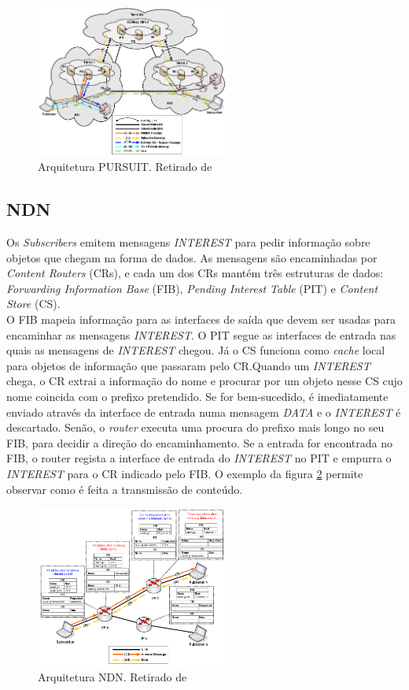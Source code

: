 \documentclass[conference]{IEEEtran}
\begin{document}
\begin{figure}[!t]
\centering
\includegraphics[width=2.5in]{pursuit}
\caption{Arquitetura PURSUIT. Retirado de \cite{surveyICN}}
\label{pursuit}
\end{figure}


\subsection{NDN}

Os \textit{Subscribers} emitem mensagens \textit{INTEREST} para pedir informa\c{c}\~{a}o sobre objetos que chegam na forma de dados. As mensagens s\~{a}o encaminhadas por \textit{Content Routers} (CRs), e cada um dos CRs mant\'{e}m tr\^{e}s estruturas de dados: \textit{Forwarding Information Base} (FIB), \textit{Pending Interest Table} (PIT) e \textit{Content Store} (CS). \\

O FIB mapeia informa\c{c}\~{a}o para as interfaces de sa\'{i}da que devem ser usadas para encaminhar as mensagens \textit{INTEREST}. O PIT segue as interfaces de entrada nas quais as mensagens de \textit{INTEREST} chegou. J\'{a} o CS funciona como \textit{cache} local para objetos de informa\c{c}\~{a}o que passaram pelo CR.Quando um \textit{INTEREST} chega, o CR extrai a informa\c{c}\~{a}o do nome e procurar por um objeto nesse CS cujo nome coincida com o prefixo pretendido. Se for bem-sucedido, \'{e} imediatamente enviado atrav\'{e}s da interface de entrada numa mensagem \textit{DATA} e o \textit{INTEREST} \'{e} descartado. Sen\~{a}o, o \textit{router} executa uma procura do prefixo mais longo no seu FIB, para decidir a dire\c{c}\~{a}o do encaminhamento. Se a entrada for encontrada no FIB, o router regista a interface de entrada do \textit{INTEREST} no PIT e empurra o \textit{INTEREST} para o CR indicado pelo FIB. O exemplo da figura \ref{ndn} permite observar como \'{e} feita a transmiss\~{a}o de conte\'{u}do.\\

\begin{figure}[!t]
\centering
\includegraphics[width=2.5in]{ndn}
\caption{Arquitetura NDN. Retirado de \cite{surveyICN}}
\label{ndn}
\end{figure}
\end{document}
